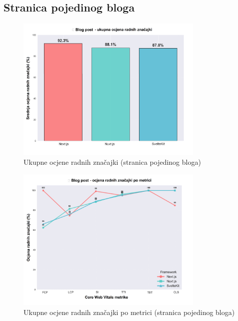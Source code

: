 
\subsection{Stranica pojedinog bloga}

\begin{figure}[H]
    \centering
    \includegraphics[width=0.8\textwidth]{slike/rezultati/blog-post/blogPost_framework_overall_performance.png}
    \caption{Ukupne ocjene radnih značajki (stranica pojedinog bloga) }
    \label{fig:testiranje-blog-post-ukupne-performanse}
\end{figure}

\begin{figure}[H]
    \centering
    \includegraphics[width=0.8\textwidth]{slike/rezultati/blog-post/blogPost_performance_by_metric.png}
    \caption{Ukupne ocjene radnih značajki po metrici (stranica pojedinog bloga) }
    \label{fig:testiranje-blog-post-performanse-po-metrici}
\end{figure}

